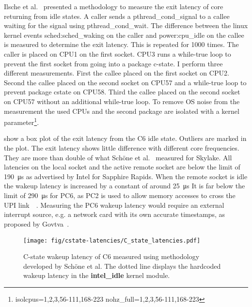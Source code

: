 Ilsche et al.~\cite{Ilsche_2018_cstate} presented a methodology to measure the exit latency of core returning from idle states.
A caller sends a pthread\_cond\_signal to a callee waiting for the signal using pthread\_cond\_wait.
The difference between the linux kernel events sched:sched\_waking on the caller and power:cpu\_idle on the callee is measured to determine the exit latency.
This is repeated for \SI{1000}{} times.
The caller is placed on CPU1 on the first socket.
CPU3 runs a while-true loop to prevent the first socket from going into a package c-state.
I perform three different measurements.
First the callee placed on the first socket on CPU2.
Second the callee placed on the second socket on CPU57 and a while-true loop to prevent package cstate on CPU58.
Third the callee placed on the second socket on CPU57 without an additional while-true loop.
To remove OS noise from the measurement the used CPUs and the second package are isolated with a kernel parameter\footnote{isolcpus=1,2,3,56-111,168-223 nohz\_full=1,2,3,56-111,168-223}.

 show a box plot of the exit latency from the C6 idle state.
Outliers are marked in the plot.
The exit latency shows little difference with different core frequencies.
They are more than double of what Schöne et al.~\cite{Schoene_2019_SKL} measured for Skylake.
All latencies on the local socket and the active remote socket are below the limit of \SI{190}{\us} as advertised by Intel for Sapphire Rapids.
When the remote socket is idle the wakeup latency is increased by a constant of around \SI{25}{\us}
It is far below the limit of \SI{290}{\us} for PC6, as PC2 is used to allow memory accesses to cross the UPI link~\cite{Intel_PowerManagementTechnologyReviewIceLake}~\cite[p.~48]{EnergyEfficientServers_2015}.
Measuring the PC6 wakeup latency would require an external interrupt source, e.g. a network card with its own accurate timestamps, as proposed by Govtva~\cite{Govtva_2019}.

\begin{figure}[!ht]
    \centering
    \texttt{[image: fig/cstate-latencies/C\_state\_latencies.pdf]}
    \caption{\label{fig:c6_latencies}C-state wakeup latency of C6 measured using methodology developed by Schöne et al.
The dotted line displays the hardcoded wakeup latency in the \protect\textbf{intel\_idle} kernel module.
\protect\footnotemark}
\end{figure}
